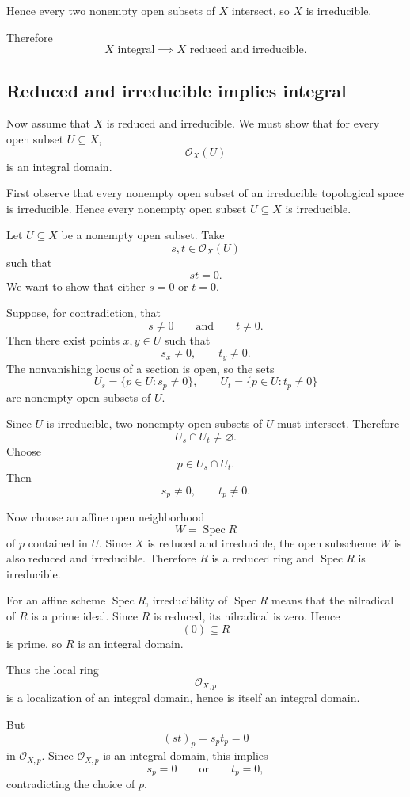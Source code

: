 \documentclass[12pt,a4paper]{article}
\DeclareMathOperator{\Spec}{Spec}
\providecommand{\Spec}{\operatorname{Spec}}
\theoremstyle{notespace}
\begin{document}
Hence every two nonempty open subsets of \(X\) intersect, so \(X\) is irreducible.

Therefore
\[
X\text{ integral}
\implies
X\text{ reduced and irreducible}.
\]

\subsection*{Reduced and irreducible implies integral}

Now assume that \(X\) is reduced and irreducible. We must show that for every open subset \(U\subseteq X\),
\[
\mathcal O_X(U)
\]
is an integral domain.

First observe that every nonempty open subset of an irreducible topological space is irreducible. Hence every nonempty open subset \(U\subseteq X\) is irreducible.

Let \(U\subseteq X\) be a nonempty open subset. Take
\[
s,t\in \mathcal O_X(U)
\]
such that
\[
st=0.
\]
We want to show that either \(s=0\) or \(t=0\).

Suppose, for contradiction, that
\[
s\neq 0
\qquad\text{and}\qquad
t\neq 0.
\]
Then there exist points \(x,y\in U\) such that
\[
s_x\neq 0,
\qquad
t_y\neq 0.
\]
The nonvanishing locus of a section is open, so the sets
\[
U_s=\{p\in U : s_p\neq 0\},
\qquad
U_t=\{p\in U : t_p\neq 0\}
\]
are nonempty open subsets of \(U\).

Since \(U\) is irreducible, two nonempty open subsets of \(U\) must intersect. Therefore
\[
U_s\cap U_t\neq \varnothing.
\]
Choose
\[
p\in U_s\cap U_t.
\]
Then
\[
s_p\neq 0,
\qquad
t_p\neq 0.
\]

Now choose an affine open neighborhood
\[
W=\Spec R
\]
of \(p\) contained in \(U\). Since \(X\) is reduced and irreducible, the open subscheme \(W\) is also reduced and irreducible. Therefore \(R\) is a reduced ring and \(\Spec R\) is irreducible.

For an affine scheme \(\Spec R\), irreducibility of \(\Spec R\) means that the nilradical of \(R\) is a prime ideal. Since \(R\) is reduced, its nilradical is zero. Hence
\[
(0)\subseteq R
\]
is prime, so \(R\) is an integral domain.

Thus the local ring
\[
\mathcal O_{X,p}
\]
is a localization of an integral domain, hence is itself an integral domain.

But
\[
(st)_p=s_p t_p=0
\]
in \(\mathcal O_{X,p}\). Since \(\mathcal O_{X,p}\) is an integral domain, this implies
\[
s_p=0
\qquad\text{or}\qquad
t_p=0,
\]
contradicting the choice of \(p\).
\end{document}
